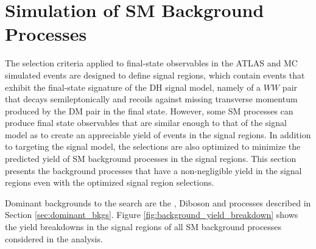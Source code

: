 \section{Simulation of SM Background Processes}
\label{sec:SM_bkg_sim}

The selection criteria applied to final-state observables in the ATLAS and MC simulated events are designed to define signal regions, which contain events that exhibit the final-state signature of the DH signal model, namely of a \(WW\) pair that decays semileptonically and recoils against missing transverse momentum produced by the DM pair in the final state. However, some SM processes can produce final state observables that are similar enough to that of the signal model as to create an appreciable yield of events in the signal regions. In addition to targeting the signal model, the selections are also optimized to minimize the predicted yield of SM background processes in the signal regions. This section presents the background processes that have a non-negligible yield in the signal regions even with the optimized signal region selections.

Dominant backgrounds to the search are the \wjets, Diboson and \ttbar processes described in Section \ref{sec:dominant_bkgs}. 
Figure \ref{fig:background_yield_breakdown} shows the yield breakdowns in the signal regions of all SM background processes considered in the analysis.

